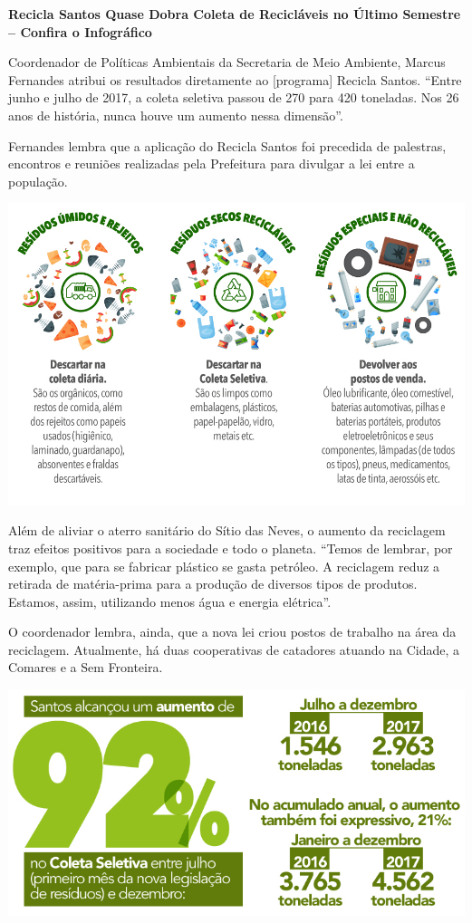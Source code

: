 \begin{myquote}
\textbf{Recicla Santos Quase Dobra Coleta de Recicláveis no Último
Semestre -- Confira o Infográfico}


Coordenador de Políticas Ambientais da Secretaria de Meio Ambiente,
Marcus Fernandes atribui os resultados diretamente ao [programa] Recicla Santos.
``Entre junho e julho de 2017, a coleta seletiva passou de 270 para 420
toneladas. Nos 26 anos de história, nunca houve um aumento nessa
dimensão''.

Fernandes lembra que a aplicação do Recicla Santos foi precedida de
palestras, encontros e reuniões realizadas pela Prefeitura para divulgar
a lei entre a população.

\begin{center}
\includegraphics[width=\textwidth]{media/image30.jpeg}
\end{center}

Além de aliviar o aterro sanitário do Sítio das Neves, o aumento da
reciclagem traz efeitos positivos para a sociedade e todo o planeta.
``Temos de lembrar, por exemplo, que para se fabricar plástico se gasta
petróleo. A reciclagem reduz a retirada de matéria-prima para a produção
de diversos tipos de produtos. Estamos, assim, utilizando menos água e
energia elétrica''.

O coordenador lembra, ainda, que a nova lei criou postos de trabalho na
área da reciclagem. Atualmente, há duas cooperativas de catadores
atuando na Cidade, a Comares e a Sem Fronteira.

\begin{center}
\includegraphics[width=\textwidth]{media/image31.jpeg}
\end{center}


\end{myquote}
